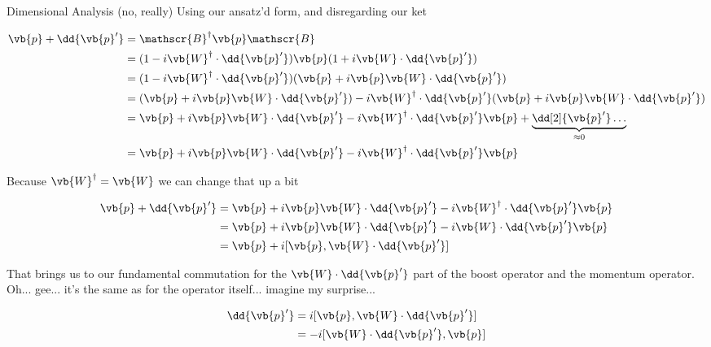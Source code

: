 \begin{answer}
\begin{answerpart}{Dimensional Analysis (no, really)}
    Using our ansatz'd form, and disregarding our ket

    \begin{equation}
      \begin{split}
        \vb{p} + \dd{\vb{p}'}
        &= \mathscr{B}^{\dagger}\vb{p}\mathscr{B}
        \\
        &= (1 - i\vb{W}^{\dagger}\cdot\dd{\vb{p}'})
        \vb{p}
        (1 + i\vb{W}\cdot\dd{\vb{p}'})
        \\
        &= (1 - i\vb{W}^{\dagger}\cdot\dd{\vb{p}'})
        (\vb{p} + i\vb{p}\vb{W}\cdot\dd{\vb{p}'})
        \\
        &=
        (\vb{p} + i\vb{p}\vb{W}\cdot\dd{\vb{p}'})
        - i\vb{W}^{\dagger}\cdot\dd{\vb{p}'}(\vb{p} + i\vb{p}\vb{W}\cdot\dd{\vb{p}'})
        \\
        &=
        \vb{p}
        + i\vb{p}\vb{W}\cdot\dd{\vb{p}'}
        - i\vb{W}^{\dagger}\cdot\dd{\vb{p}'}\vb{p}
        + \underbrace{\dd[2]{\vb{p}'}\ldots}_{\approx 0}
        \\
        &=
        \vb{p}
        + i\vb{p}\vb{W}\cdot\dd{\vb{p}'}
        - i\vb{W}^{\dagger}\cdot\dd{\vb{p}'}\vb{p}
        \\
      \end{split}
    \end{equation}

    Because $\vb{W}^{\dagger}=\vb{W}$ we can change that up a bit

    \begin{equation}
      \begin{split}
        \vb{p} + \dd{\vb{p}'}
        &=
        \vb{p}
        + i\vb{p}\vb{W}\cdot\dd{\vb{p}'}
        - i\vb{W}^{\dagger}\cdot\dd{\vb{p}'}\vb{p}
        \\
        &=
        \vb{p}
        + i\vb{p}\vb{W}\cdot\dd{\vb{p}'}
        - i\vb{W}\cdot\dd{\vb{p}'}\vb{p}
        \\
        &= \vb{p} + i[\vb{p},\vb{W}\cdot\dd{\vb{p}'}]\\
      \end{split}
    \end{equation}

    That brings us to our fundamental commutation for the
    $\vb{W}\cdot\dd{\vb{p}'}$ part of the boost operator and the
    momentum operator.  Oh... gee... it's the same as for the operator
    itself... imagine my surprise...

    \begin{equation}
      \begin{split}
        \dd{\vb{p}'}
        &= i[\vb{p},\vb{W}\cdot\dd{\vb{p}'}]\\
        &= -i[\vb{W}\cdot\dd{\vb{p}'},\vb{p}]\\
      \end{split}
    \end{equation}
    

\end{answerpart}
\end{answer}
